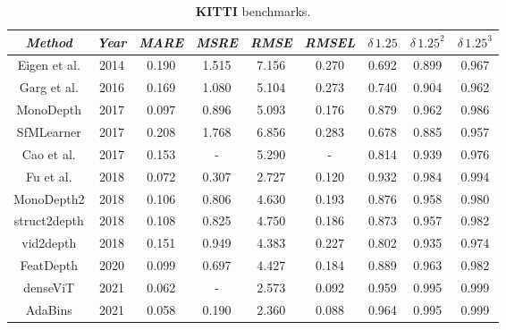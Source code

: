 \begin{table}
	\begin{tabular}{c|c|c|c|c|c|c|c|c}
		\emph{Method} & \emph{Year} & \emph{MARE} & \emph{MSRE} & \emph{RMSE} & \emph{RMSEL} & \emph{$\delta \, 1.25$} & \emph{$\delta \, 1.25^{2}$} & \emph{$\delta \, 1.25^{3}$} \\
		\hline
		Eigen et al. \cite{Eigen}                  & 2014 & 0.190 & 1.515 & 7.156 & 0.270 & 0.692 & 0.899 & 0.967 \\
		Garg et al. \cite{Garg}                    & 2016 & 0.169 & 1.080 & 5.104 & 0.273 & 0.740 & 0.904 & 0.962 \\
		MonoDepth \cite{MonoDepth}                 & 2017 & 0.097 & 0.896 & 5.093 & 0.176 & 0.879 & 0.962 & 0.986 \\
		SfMLearner \cite{SfMLearner}               & 2017 & 0.208 & 1.768 & 6.856 & 0.283 & 0.678 & 0.885 & 0.957 \\
		Cao et al. \cite{depth_as_classification}  & 2017 & 0.153 &   -   & 5.290 &   -   & 0.814 & 0.939 & 0.976 \\
		Fu et al. \cite{ordinal_regression}        & 2018 & 0.072 & 0.307 & 2.727 & 0.120 & 0.932 & 0.984 & 0.994 \\
		MonoDepth2 \cite{MonoDepth2}               & 2018 & 0.106 & 0.806 & 4.630 & 0.193 & 0.876 & 0.958 & 0.980 \\
		struct2depth \cite{struct2depth}           & 2018 & 0.108 & 0.825 & 4.750 & 0.186 & 0.873 & 0.957 & 0.982 \\
		vid2depth \cite{vid2depth}                 & 2018 & 0.151 & 0.949 & 4.383 & 0.227 & 0.802 & 0.935 & 0.974 \\
		FeatDepth \cite{FeatDepth}                 & 2020 & 0.099 & 0.697 & 4.427 & 0.184 & 0.889 & 0.963 & 0.982 \\
		denseViT \cite{denseViT}                   & 2021 & 0.062 &   -   & 2.573 & 0.092 & 0.959 & 0.995 & 0.999 \\
		AdaBins \cite{AdaBins}                     & 2021 & 0.058 & 0.190 & 2.360 & 0.088 & 0.964 & 0.995 & 0.999 \\
	\end{tabular}
	\caption{
		\textbf{KITTI} benchmarks.
		\label{t:kitti_benchmarks}
	}
\end{table}

